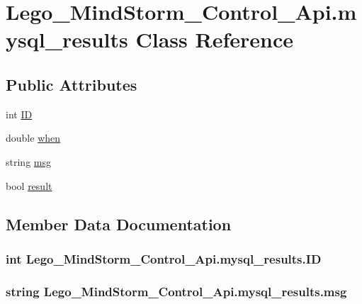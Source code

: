 \hypertarget{class_lego___mind_storm___control___api_1_1mysql__results}{
\section{Lego\_\-MindStorm\_\-Control\_\-Api.mysql\_\-results Class Reference}
\label{class_lego___mind_storm___control___api_1_1mysql__results}
}
\subsection*{Public Attributes}
\begin{CompactItemize}
\item 
int \hyperlink{class_lego___mind_storm___control___api_1_1mysql__results_c90f608c78105e7af79e3b6b107cc74e}{ID}
\item 
double \hyperlink{class_lego___mind_storm___control___api_1_1mysql__results_ac69cb8b3d47f0039bfd58b5aa46f41f}{when}
\item 
string \hyperlink{class_lego___mind_storm___control___api_1_1mysql__results_c3772515fa12895ef4eb449ad3bc3506}{msg}
\item 
bool \hyperlink{class_lego___mind_storm___control___api_1_1mysql__results_74bbf9491a54cddbca45e4ae9c94b899}{result}
\end{CompactItemize}


\subsection{Member Data Documentation}
\hypertarget{class_lego___mind_storm___control___api_1_1mysql__results_c90f608c78105e7af79e3b6b107cc74e}{
\subsubsection[{ID}]{\setlength{\rightskip}{0pt plus 5cm}int {\bf Lego\_\-MindStorm\_\-Control\_\-Api.mysql\_\-results.ID}}}
\label{class_lego___mind_storm___control___api_1_1mysql__results_c90f608c78105e7af79e3b6b107cc74e}


\hypertarget{class_lego___mind_storm___control___api_1_1mysql__results_c3772515fa12895ef4eb449ad3bc3506}{
\subsubsection[{msg}]{\setlength{\rightskip}{0pt plus 5cm}string {\bf Lego\_\-MindStorm\_\-Control\_\-Api.mysql\_\-results.msg}}}
\label{class_lego___mind_storm___control___api_1_1mysql__results_c3772515fa12895ef4eb449ad3bc3506}


